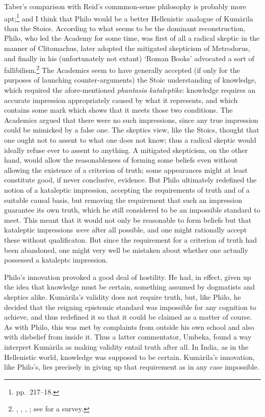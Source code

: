 ﻿\documentclass[11pt]{amsart}
\begin{document}
Taber's comparison with Reid's commmon-sense philosophy is probably more apt;\footnote{pp.~217--18.} and I think that Philo would be a better Hellenistic analogue of Kum\=arila than the Stoics. According to what seems to be the dominant reconstruction, Philo, who led the Academy for some time, was first of all a radical skeptic in the manner of Clitomachus, later adopted the mitigated skepticism of Metrodorus, and finally in his (unfortunately not extant) `Roman Books' advocated a sort of fallibilism.\footnote{\citet{frede-sceptic}, \citet{barnes1989antiochus}, \citet{striker1997academics}, \citet{brittain2001philo}; see \citet{sep-philo-larissa} for a survey.} The Academics seem to have generally accepted (if only for the purposes of launching counter-arguments) the Stoic understanding of knowledge, which required the afore-mentioned \emph{phantasia kataleptike}: knowledge requires an accurate impression appropriately caused by what it represents, and which contains some mark which shows that it meets those two conditions. The Academics argued that there were no such impressions, since any true impression could be mimicked by a false one. The skeptics view, like the Stoics, thought that one ought not to assent to what one does not know; thus a radical skeptic would ideally refuse ever to assent to anything. A mitigated skepticism, on the other hand, would allow the reasonableness of forming some beliefs even without allowing the existence of a criterion of truth; some appearances might at least constitute good, if never conclusive, evidence. But Philo ultimately redefined the notion of a kataleptic impression, accepting the requirements of truth and of a suitable causal basis, but removing the requirement that such an impression guarantee its own truth, which he still considered to be an impossible standard to meet. This meant that it would not only be reasonable to form beliefs but that kataleptic impressions \emph{were} after all possible, and one might rationally accept these without qualificaton. But since the requirement for a criterion of truth had been abandoned, one might very well be mistaken about whether one actually possessed a kataleptc impression.

Philo's innovation provoked a good deal of hostility. He had, in effect, given up the idea that knowledge must be certain, something assumed by dogmatists and skeptics alike. Kum\=arila's validity does not require truth, but, like Philo, he decided that the reigning epistemic standard was impossible for any cognition to achieve, and thus redefined it so that it could be claimed as a matter of course. As with Philo, this was met by complaints from outside his own school and also with disbelief from inside it. Thus a latter commentator, Umbeka, found a way interpret Kum\=arila as making validity entail truth after all. In India, as in the Hellenistic world, knowledge was supposed to be certain. Kum\=arila's innovation, like Philo's, lies precisely in giving up that requirement as in any case impossible.
\end{document}
